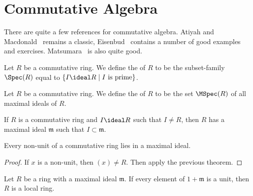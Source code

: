 
\chapter{Commutative Algebra}

\begin{remark}[References]
There are quite a few references for commutative algebra.
Atiyah and Macdonald~\cite{atiyah1969introduction} remains a classic,
Eisenbud~\cite{eisenbud1994commutative} contains a number of good
examples and exercises. Matsumara~\cite{matsumura1970commutative}
is also quite good.
\end{remark}

\begin{definition}
Let $R$ be a commutative ring. We define the  of $R$
to be the subset-family $\Spec(R)$ equal to $\{I\ideal R\mid I\mbox{ is prime}\}$.
\end{definition}

\begin{definition}
Let $R$ be a commutative ring.
We define the  of $R$ to be the set $\MSpec(R)$ of all
maximal ideals of $R$.
\end{definition}

\begin{theorem}
If $R$ is a commutative ring and $I\ideal R$ such that $I\neq R$,
then $R$ has a maximal ideal $\mathfrak{m}$ such that $I\subset\mathfrak{m}$.
\end{theorem}

\begin{corollary}
Every non-unit of a commutative ring lies in a maximal ideal.
\end{corollary}

\begin{proof}
If $x$ is a non-unit, then $(x)\neq R$. Then apply the previous theorem.
\end{proof}

\begin{proposition}
Let $R$ be a ring with a maximal ideal $\mathfrak{m}$. If every
element of $1+\mathfrak{m}$ is a unit, then $R$ is a local ring.
\end{proposition}

